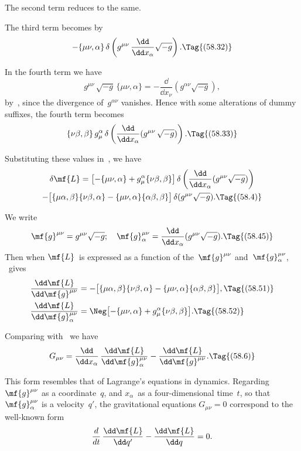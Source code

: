 \documentclass[12pt]{book}
\begin{document}
The second term reduces to the same.

The third term becomes by~
\[
-\{\mu\nu, \alpha\}\, \delta\left(g^{\mu\nu}\, \frac{\dd}{\dd x_{\alpha}} \sqrt{-g}\right).
\Tag{(58.32)}
\]

In the fourth term we have
\[
g^{\mu\nu}\, \sqrt{-g}\, \{\mu\nu, \alpha\}
= -\frac{\dd}{\dd x_{\nu}}(g^{\alpha\nu} \sqrt{-g}),
\]
by~, since the divergence of~$g^{\alpha\nu}$ vanishes. Hence with some alterations
of dummy suffixes, the fourth term becomes
\[
\{\nu\beta, \beta\}\, g_{\mu}^{\alpha}\, \delta\left(\frac{\dd}{\dd x_{\alpha}} (g^{\mu\nu}\, \sqrt{-g})\right).
\Tag{(58.33)}
\]

Substituting these values in~, we have
\begin{multline*}
  \delta\mf{L} = \bigl[-\{\mu\nu, \alpha\} + g_{\mu}^{\alpha} \{\nu\beta, \beta\}\bigr]\,
  \delta\left(\frac{\dd}{\dd x_{\alpha}} (g^{\mu\nu} \sqrt{-g})\right) \\
  - \bigl[\{\mu\alpha, \beta\} \{\nu\beta, \alpha\} - \{\mu\nu, \alpha\} \{\alpha\beta, \beta\}\bigr]\,
  \delta(g^{\mu\nu} \sqrt{-g}).
  \Tag{(58.4)}
\end{multline*}

We write
\[
\mf{g}^{\mu\nu} = g^{\mu\nu} \sqrt{-g};\quad
\mf{g}_{\alpha}^{\mu\nu} = \frac{\dd}{\dd x_{\alpha}} (g^{\mu\nu} \sqrt{-g}).
\Tag{(58.45)}
\]
Then when $\mf{L}$~is expressed as a function of the~$\mf{g}^{\mu\nu}$ and~$\mf{g}_{\alpha}^{\mu\nu}$, ~gives
\begin{align*}
  \frac{\dd\mf{L}}{\dd\mf{g}^{\mu\nu}}
  &= -\bigl[\{\mu\alpha, \beta\} \{\nu\beta, \alpha\} - \{\mu\nu, \alpha\} \{\alpha\beta, \beta\}\bigr],
  \Tag{(58.51)} \\
  \frac{\dd\mf{L}}{\dd\mf{g}_{\alpha}^{\mu\nu}}
  &= \Neg\bigl[-\{\mu\nu, \alpha\} + g_{\mu}^{\alpha} \{\nu\beta, \beta\}\bigr].
  \Tag{(58.52)}
\end{align*}

Comparing with~ we have
\[
G_{\mu\nu} = \frac{\dd}{\dd x_{\alpha}}\, \frac{\dd\mf{L}}{\dd\mf{g}_{\alpha}^{\mu\nu}} - \frac{\dd\mf{L}}{\dd\mf{g}^{\mu\nu}}.
\Tag{(58.6)}
\]

This form resembles that of Lagrange's equations in dynamics. Regarding
%
$\mf{g}^{\mu\nu}$ as a coordinate~$q$, and $x_{\alpha}$~as a four\hyp{}dimensional time~$t$, so that $\mf{g}_{\alpha}^{\mu\nu}$ is a velocity~$q'$,
the gravitational equations $G_{\mu\nu} = 0$ correspond to the well-known form
\[
\frac{d}{dt}\, \frac{\dd\mf{L}}{\dd q'} - \frac{\dd\mf{L}}{\dd q} = 0.
\]
\end{document}
